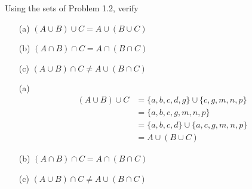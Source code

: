 \exercise
Using the sets of Problem 1.2, verify
\begin{itemize}
    \item[(a)]
        $(A \cup B) \cup C = A \cup (B \cup C)$
    \item[(b)]
        $(A \cap B) \cap C = A \cap (B \cap C)$
    \item[(c)]
        $(A \cup B) \cap C \neq A \cup (B \cap C)$
\end{itemize}

\answer
\begin{itemize}
    \item[(a)]
        \begin{align*}
            (A \cup B) \cup C &= \{a, b, c, d, g\} \cup \{c, g, m, n, p\} \\
                              &= \{a, b, c, g, m, n, p\} \\
                              &= \{a, b, c, d\} \cup \{a, c, g, m, n, p\} \\
                              &= A \cup (B \cup C)
        \end{align*}
    \item[(b)]
        $(A \cap B) \cap C = A \cap (B \cap C)$
    \item[(c)]
        $(A \cup B) \cap C \neq A \cup (B \cap C)$
\end{itemize}


\exercise

\answer
